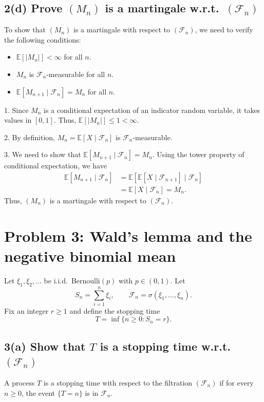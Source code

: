 \documentclass[answers,12pt,addpoints]{exam}
\begin{document}
\subsection*{2(d) Prove \texorpdfstring{$(M_n)$}{Mn} is a martingale w.r.t.\ \texorpdfstring{$(\mathcal{F}_n)$}{Fn}}

To show that $(M_n)$ is a martingale with respect to $(\mathcal{F}_n)$, we need to verify the following conditions:
\begin{itemize}
    \item $\mathbb{E}[|M_n|] < \infty$ for all $n$.
    \item $M_n$ is $\mathcal{F}_n$-measurable for all $n$.
    \item $\mathbb{E}[M_{n+1} \mid \mathcal{F}_n] = M_n$ for all $n$.
\end{itemize}
1. Since $M_n$ is a conditional expectation of an indicator random variable, it takes values in $[0,1]$. Thus, $\mathbb{E}[|M_n|] \leq 1 < \infty$.

2. By definition, $M_n = \mathbb{E}[X \mid \mathcal{F}_n]$ is $\mathcal{F}_n$-measurable.

3. We need to show that $\mathbb{E}[M_{n+1} \mid \mathcal{F}_n] = M_n$. Using the tower property of conditional expectation, we have
\begin{align*}
\mathbb{E}[M_{n+1} \mid \mathcal{F}_n] &= \mathbb{E}[\mathbb{E}[X \mid \mathcal{F}_{n+1}] \mid \mathcal{F}_n] \\
&= \mathbb{E}[X \mid \mathcal{F}_n] = M_n.
\end{align*}
Thus, $(M_n)$ is a martingale with respect to $(\mathcal{F}_n)$.

\section*{Problem 3: Wald's lemma and the negative binomial mean}

Let $\xi_1, \xi_2, \dots$ be i.i.d.\ Bernoulli$(p)$ with $p \in (0,1)$. Let
\[
S_n = \sum_{i=1}^n \xi_i, \qquad \mathcal{F}_n = \sigma(\xi_1,\dots,\xi_n).
\]
Fix an integer $r \ge 1$ and define the stopping time
\[
T = \inf\{n \ge 0 : S_n = r\}.
\]

\subsection*{3(a) Show that \texorpdfstring{$T$}{T} is a stopping time w.r.t.\ \texorpdfstring{$(\mathcal{F}_n)$}{Fn}}

A process $T$ is a stopping time with respect to the filtration $(\mathcal{F}_n)$ if for every $n \geq 0$, the event $\{T = n\}$ is in $\mathcal{F}_n$.
\end{document}
